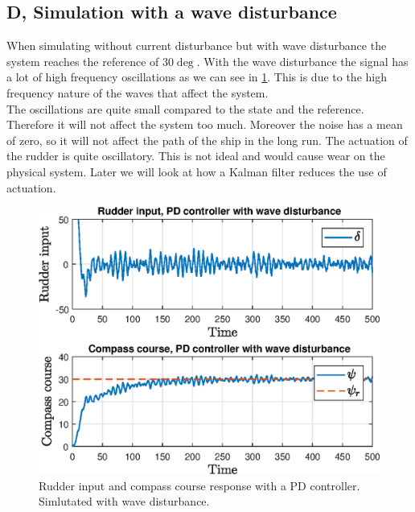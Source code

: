 \subsection{D, Simulation with a wave disturbance}
When simulating without current disturbance but with wave disturbance the system reaches the reference of 30$\deg$. With the wave disturbance the signal has a lot of high frequency oscillations as we can see in \cref{fig:p3pd_rudder_heading}. This is due to the high frequency nature of the waves that affect the system. \\
The oscillations are quite small compared to the state and the reference. Therefore it will not affect the system too much. Moreover the noise has a mean of zero, so it will not affect the path of the ship in the long run. The actuation of the rudder is quite oscillatory. This is not ideal and would cause wear on the physical system. Later we will look at how a Kalman filter reduces the use of actuation.  
\begin{figure}
    \centering
    \includegraphics[width = 1.00\textwidth]{figures/plots/P5p3d_rudder_heading.eps}
    \caption{Rudder input and compass course response with a PD controller. Simlutated with wave disturbance.}
    \label{fig:p3pd_rudder_heading}
\end{figure}
